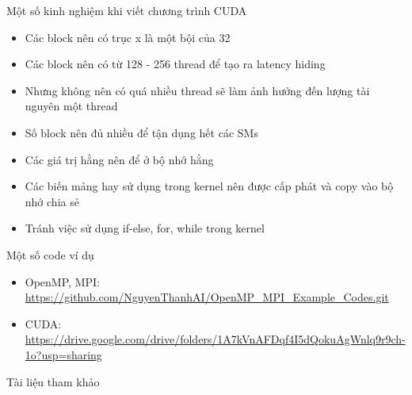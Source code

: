 \documentclass[10pt]{beamer}
\theoremstyle{remark}
\numberwithin{algocf}{section}
\numberwithin{equation}{section}
\numberwithin{dl}{section}
\numberwithin{figure}{section}
\begin{document}
\begin{frame}{Một số kinh nghiệm khi viết chương trình CUDA}
    \begin{itemize}
        \item Các block nên có trục x là một bội của 32
        \item Các block nên có từ 128 - 256 thread để tạo ra latency hiding
        \item Nhưng không nên có quá nhiều thread sẽ làm ảnh hưởng đến lượng tài nguyên một thread
        \item Số block nên đủ nhiều để tận dụng hết các SMs
        \item Các giá trị hằng nên để ở bộ nhớ hằng
        \item Các biến mảng hay sử dụng trong kernel nên được cấp phát và copy vào bộ nhớ chia sẻ
        \item Tránh việc sử dụng if-else, for, while trong kernel 
    \end{itemize}
\end{frame}

\begin{frame}{Một số code ví dụ}
    \begin{itemize}
        \item OpenMP, MPI: \url{https://github.com/NguyenThanhAI/OpenMP_MPI_Example_Codes.git}
        \item CUDA: \url{https://drive.google.com/drive/folders/1A7kVnAFDqf4I5dQokuAgWnlq9r9ch-1o?usp=sharing}
    \end{itemize}
\end{frame}

\begin{frame}{Tài liệu tham khảo}
    \printbibliography
\end{frame}
\end{document}
